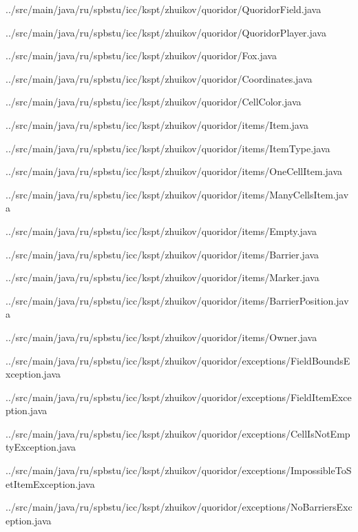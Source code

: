 \documentclass[a4paper]{article}
\begin{document}

{../src/main/java/ru/spbstu/icc/kspt/zhuikov/quoridor/QuoridorField.java}
\newpage


{../src/main/java/ru/spbstu/icc/kspt/zhuikov/quoridor/QuoridorPlayer.java}
\newpage


{../src/main/java/ru/spbstu/icc/kspt/zhuikov/quoridor/Fox.java}
\newpage


{../src/main/java/ru/spbstu/icc/kspt/zhuikov/quoridor/Coordinates.java}
\newpage


{../src/main/java/ru/spbstu/icc/kspt/zhuikov/quoridor/CellColor.java}
\newpage


{../src/main/java/ru/spbstu/icc/kspt/zhuikov/quoridor/items/Item.java}


{../src/main/java/ru/spbstu/icc/kspt/zhuikov/quoridor/items/ItemType.java}


{../src/main/java/ru/spbstu/icc/kspt/zhuikov/quoridor/items/OneCellItem.java}


{../src/main/java/ru/spbstu/icc/kspt/zhuikov/quoridor/items/ManyCellsItem.java}


{../src/main/java/ru/spbstu/icc/kspt/zhuikov/quoridor/items/Empty.java}


{../src/main/java/ru/spbstu/icc/kspt/zhuikov/quoridor/items/Barrier.java}


{../src/main/java/ru/spbstu/icc/kspt/zhuikov/quoridor/items/Marker.java}


{../src/main/java/ru/spbstu/icc/kspt/zhuikov/quoridor/items/BarrierPosition.java}


{../src/main/java/ru/spbstu/icc/kspt/zhuikov/quoridor/items/Owner.java}
\newpage


{../src/main/java/ru/spbstu/icc/kspt/zhuikov/quoridor/exceptions/FieldBoundsException.java}


{../src/main/java/ru/spbstu/icc/kspt/zhuikov/quoridor/exceptions/FieldItemException.java}


{../src/main/java/ru/spbstu/icc/kspt/zhuikov/quoridor/exceptions/CellIsNotEmptyException.java}


{../src/main/java/ru/spbstu/icc/kspt/zhuikov/quoridor/exceptions/ImpossibleToSetItemException.java}


{../src/main/java/ru/spbstu/icc/kspt/zhuikov/quoridor/exceptions/NoBarriersException.java}
\end{document}
